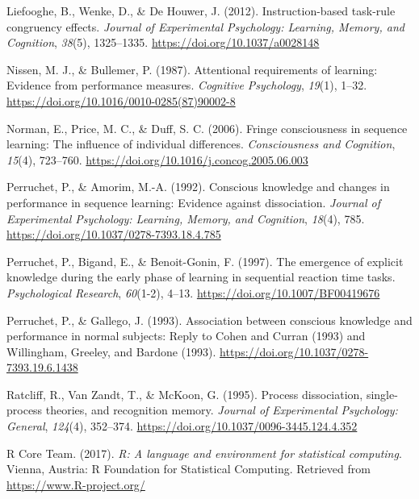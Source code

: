 \documentclass[english,,man]{apa6}
\begin{document}
\leavevmode\hypertarget{ref-liefooghe_instruction-based_2012}{}%
Liefooghe, B., Wenke, D., \& De Houwer, J. (2012). Instruction-based task-rule congruency effects. \emph{Journal of Experimental Psychology: Learning, Memory, and Cognition}, \emph{38}(5), 1325--1335. \url{https://doi.org/10.1037/a0028148}

\leavevmode\hypertarget{ref-nissen_attentional_1987}{}%
Nissen, M. J., \& Bullemer, P. (1987). Attentional requirements of learning: Evidence from performance measures. \emph{Cognitive Psychology}, \emph{19}(1), 1--32. \url{https://doi.org/10.1016/0010-0285(87)90002-8}

\leavevmode\hypertarget{ref-norman_fringe_2006}{}%
Norman, E., Price, M. C., \& Duff, S. C. (2006). Fringe consciousness in sequence learning: The influence of individual differences. \emph{Consciousness and Cognition}, \emph{15}(4), 723--760. \url{https://doi.org/10.1016/j.concog.2005.06.003}

\leavevmode\hypertarget{ref-perruchet_conscious_1992}{}%
Perruchet, P., \& Amorim, M.-A. (1992). Conscious knowledge and changes in performance in sequence learning: Evidence against dissociation. \emph{Journal of Experimental Psychology: Learning, Memory, and Cognition}, \emph{18}(4), 785. \url{https://doi.org/10.1037/0278-7393.18.4.785}

\leavevmode\hypertarget{ref-perruchet_emergence_1997}{}%
Perruchet, P., Bigand, E., \& Benoit-Gonin, F. (1997). The emergence of explicit knowledge during the early phase of learning in sequential reaction time tasks. \emph{Psychological Research}, \emph{60}(1-2), 4--13. \url{https://doi.org/10.1007/BF00419676}

\leavevmode\hypertarget{ref-perruchet_association_1993}{}%
Perruchet, P., \& Gallego, J. (1993). Association between conscious knowledge and performance in normal subjects: Reply to Cohen and Curran (1993) and Willingham, Greeley, and Bardone (1993). \url{https://doi.org/10.1037/0278-7393.19.6.1438}

\leavevmode\hypertarget{ref-ratcliff_process_1995}{}%
Ratcliff, R., Van Zandt, T., \& McKoon, G. (1995). Process dissociation, single-process theories, and recognition memory. \emph{Journal of Experimental Psychology: General}, \emph{124}(4), 352--374. \url{https://doi.org/10.1037/0096-3445.124.4.352}

\leavevmode\hypertarget{ref-R-base}{}%
R Core Team. (2017). \emph{R: A language and environment for statistical computing}. Vienna, Austria: R Foundation for Statistical Computing. Retrieved from \url{https://www.R-project.org/}
\end{document}

